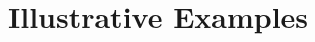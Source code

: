 \documentclass[preprint,12pt, a4paper]{elsarticle}
\newcommand{\1}{{\rm 1\hspace{-0.9mm}l}}
\newcommand{\Id}{{\rm 1\hspace{-0.9mm}l}}
\newcommand{\HH}{\mathcal{H}}
\newcommand{\tr}{\mathrm{tr}}
\begin{document}

%





\section{Illustrative Examples}
\end{document}
